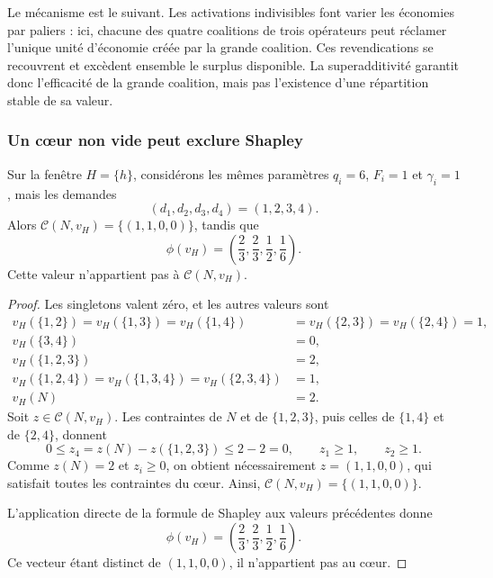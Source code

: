Le mécanisme est le suivant. Les activations indivisibles font varier les
économies par paliers : ici, chacune des quatre coalitions de trois opérateurs
peut réclamer l'unique unité d'économie créée par la grande coalition. Ces
revendications se recouvrent et excèdent ensemble le surplus disponible. La
superadditivité garantit donc l'efficacité de la grande coalition, mais pas
l'existence d'une répartition stable de sa valeur.

\subsubsection{Un cœur non vide peut exclure Shapley}

\begin{proposition}
\label{prop:shapley_hors_coeur_semi_homogene}
\label{prop:shapley_hors_coeur_tres_faible_trafic}
Sur la fenêtre \(H=\{h\}\), considérons les mêmes paramètres
\(q_i=6\), \(F_i=1\) et \(\gamma_i=1\), mais les demandes
\[
    (d_1,d_2,d_3,d_4)=(1,2,3,4).
\]
Alors \(\mathcal C(N,v_H)=\{(1,1,0,0)\}\), tandis que
\[
    \phi(v_H)
    =\left(\frac23,\frac23,\frac12,\frac16\right).
\]
Cette valeur n'appartient pas à \(\mathcal C(N,v_H)\).
\end{proposition}

\begin{proof}
Les singletons valent zéro, et les autres valeurs sont
\[
\begin{aligned}
v_H(\{1,2\})=v_H(\{1,3\})=v_H(\{1,4\})
&=v_H(\{2,3\})=v_H(\{2,4\})=1,\\
v_H(\{3,4\})&=0,\\
v_H(\{1,2,3\})&=2,\\
v_H(\{1,2,4\})=v_H(\{1,3,4\})=v_H(\{2,3,4\})&=1,\\
v_H(N)&=2.
\end{aligned}
\]
Soit \(z\in\mathcal C(N,v_H)\). Les contraintes de \(N\) et de
\(\{1,2,3\}\), puis celles de \(\{1,4\}\) et de \(\{2,4\}\), donnent
\[
0\leqslant z_4=z(N)-z(\{1,2,3\})\leqslant2-2=0,
\qquad z_1\geqslant1,
\qquad z_2\geqslant1.
\]
Comme \(z(N)=2\) et \(z_i\geqslant0\), on obtient nécessairement
\(z=(1,1,0,0)\), qui satisfait toutes les contraintes du cœur. Ainsi,
\(\mathcal C(N,v_H)=\{(1,1,0,0)\}\).

L'application directe de la formule de Shapley aux valeurs précédentes donne
\[
    \phi(v_H)=\left(\frac23,\frac23,\frac12,\frac16\right).
\]
Ce vecteur étant distinct de \((1,1,0,0)\), il n'appartient pas au cœur.
\end{proof}

